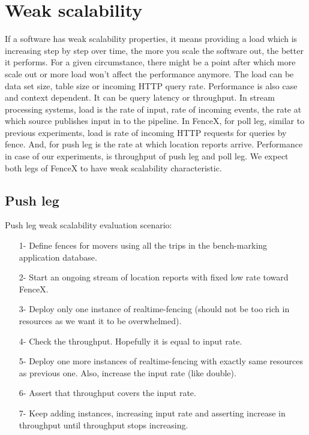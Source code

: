 \documentclass[a4]{report}
\begin{document}
    \section{Weak scalability}
    If a software has weak scalability properties, it means providing a load which is increasing step by step over
    time, the more you scale the software out, the better it performs.
    For a given circumstance, there might be a point after which more scale out or more load won't affect
    the performance anymore.
    The load can be data set size, table size or incoming HTTP query rate.
    Performance is also case and context dependent.
    It can be query latency or throughput.
    In stream processing systems, load is the rate of input, rate of incoming events, the rate at
    which source publishes input in to the pipeline.
    In FenceX, for poll leg, similar to previous experiments, load is rate of incoming HTTP requests for queries by
    fence.
    And, for push leg is the rate at which location reports arrive.
    Performance in case of our experiments, is throughput of push leg and poll leg.
    We expect both legs of FenceX to have weak scalability characteristic.

    \subsection{Push leg}
    Push leg weak scalability evaluation scenario:
    \begin{itemize}
        \item[1-] Define fences for movers using all the trips in the bench-marking application database.
        \item[2-] Start an ongoing stream of location reports with fixed low rate toward FenceX.
        \item[3-] Deploy only one instance of realtime-fencing (should not be too rich in resources as we want it to
        be overwhelmed).
        \item[4-] Check the throughput. Hopefully it is equal to input rate.
        \item[5-] Deploy one more instances of realtime-fencing with exactly same resources as previous one. Also,
        increase the input rate (like double).
        \item[6-] Assert that throughput covers the input rate.
        \item[7-] Keep adding instances, increasing input rate and asserting increase in throughput until throughput
        stops increasing.
    \end{itemize}
\end{document}
